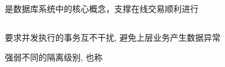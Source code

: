 
\begin{frame}{}
  \begin{center}
    是数据库系统中的核心概念，支撑在线交易顺利进行
  \end{center}

  \begin{columns}
  \end{columns}

  \vspace{0.30cm}
  \begin{center}
    要求并发执行的事务互不干扰, 避免上层业务产生数据异常
  \end{center}
\end{frame}

\begin{frame}{}
  \begin{center}
    强弱不同的隔离级别, 也称

    \vspace{0.30cm}
  \end{center}
\end{frame}





